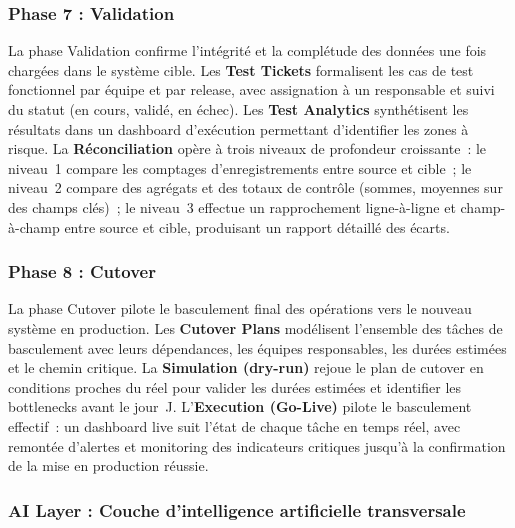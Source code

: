 \subsubsection*{Phase 7 : Validation}
\label{subsubsec:phase-validation}

La phase Validation confirme l'intégrité et la complétude des données une fois chargées dans le système cible. Les \textbf{Test Tickets} formalisent les cas de test fonctionnel par équipe et par release, avec assignation à un responsable et suivi du statut (en cours, validé, en échec). Les \textbf{Test Analytics} synthétisent les résultats dans un dashboard d'exécution permettant d'identifier les zones à risque. La \textbf{Réconciliation} opère à trois niveaux de profondeur croissante~: le niveau~1 compare les comptages d'enregistrements entre source et cible~; le niveau~2 compare des agrégats et des totaux de contrôle (sommes, moyennes sur des champs clés)~; le niveau~3 effectue un rapprochement ligne-à-ligne et champ-à-champ entre source et cible, produisant un rapport détaillé des écarts.

\subsubsection*{Phase 8 : Cutover}
\label{subsubsec:phase-cutover}

La phase Cutover pilote le basculement final des opérations vers le nouveau système en production. Les \textbf{Cutover Plans} modélisent l'ensemble des tâches de basculement avec leurs dépendances, les équipes responsables, les durées estimées et le chemin critique. La \textbf{Simulation (dry-run)} rejoue le plan de cutover en conditions proches du réel pour valider les durées estimées et identifier les bottlenecks avant le jour~J. L'\textbf{Execution (Go-Live)} pilote le basculement effectif~: un dashboard live suit l'état de chaque tâche en temps réel, avec remontée d'alertes et monitoring des indicateurs critiques jusqu'à la confirmation de la mise en production réussie.

\subsubsection*{AI Layer : Couche d'intelligence artificielle transversale}
\label{subsubsec:ai-layer}

